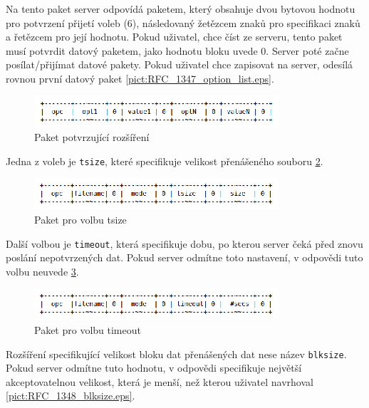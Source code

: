 \documentclass[11pt]{article}
\begin{document}
Na tento paket server odpovídá paketem, který obsahuje dvou bytovou hodnotu pro potvrzení přijetí voleb (6), následovaný žetězcem znaků pro specifikaci znaků a řetězcem pro její hodnotu.
Pokud uživatel, chce číst ze serveru, tento paket musí potvrdit datový paketem, jako hodnotu bloku uvede 0. Server poté začne posílat/přijímat datové pakety. Pokud uživatel chce zapisovat na server, odesílá rovnou první datový paket \ref{pict:RFC_1347_option_list.eps}. \cite{option_extension}

\begin{figure}[ht]
    \label{pict:RFC_1347_option_list_ack.eps} 
    \centering
    \includegraphics[scale=2.0]{RFC_2347_option_list_ack.eps}
    \caption{Paket potvrzující rozšíření \cite{option_extension}}        
\end{figure}

Jedna z voleb je \texttt{tsize}, které specifikuje velikost přenášeného souboru \ref{pict:RFC_1349_tsize.eps}.

\begin{figure}[ht]
    \label{pict:RFC_1349_tsize.eps} 
    \centering
    \includegraphics[scale=2.0]{RFC_2349_tsize.eps}
    \caption{Paket pro volbu tsize \cite{extension_timeout_tsize}}        
\end{figure}

Další volbou je \texttt{timeout}, která specifikuje dobu, po kterou server čeká před znovu poslání nepotvrzených dat.
Pokud server odmítne toto nastavení, v odpovědi tuto volbu neuvede \ref{pict:RFC_1349_timeout.eps}.

\begin{figure}[ht]
    \label{pict:RFC_1349_timeout.eps} 
    \centering
    \includegraphics[scale=2.0]{RFC_2349_timeoUt.eps}
    \caption{Paket pro volbu timeout \cite{extension_timeout_tsize}}        
\end{figure}

Rozšíření specifikující velikost bloku dat přenášených dat nese název \texttt{blksize}. Pokud server odmítne tuto hodnotu,
v odpovědi specifikuje největší akceptovatelnou velikost, která je menší, než kterou uživatel navrhoval \ref{pict:RFC_1348_blksize.eps}.
\end{document}
